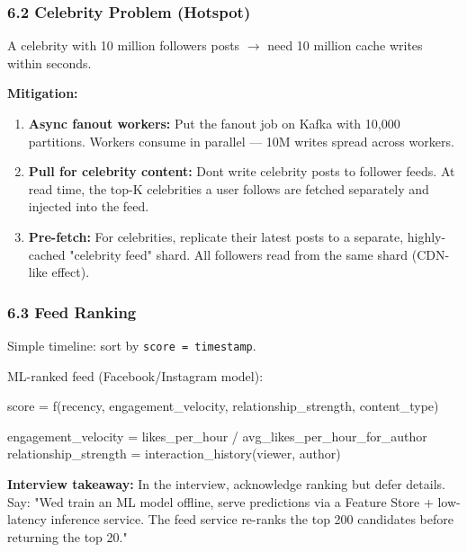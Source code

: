 \documentclass[11pt]{article}
\providecommand{\tightlist}{\setlength{\itemsep}{1pt}\setlength{\parskip}{0pt}}
\newenvironment{Shaded}{\begin{snugshade}}{\end{snugshade}}
\newcommand{\NormalTok}[1]{\textcolor[rgb]{0.81,0.81,0.76}{#1}}
\newcommand{\OperatorTok}[1]{\textcolor[rgb]{0.81,0.81,0.76}{#1}}
\begin{document}
\subsubsection{6.2 Celebrity Problem (Hotspot)}\label{62-celebrity-problem-hotspot}

A celebrity with 10 million followers posts \(\rightarrow\) need 10 million cache writes within seconds.

\textbf{Mitigation:}

\begin{enumerate}
\def\labelenumi{\arabic{enumi}.}
\tightlist
\item
  \textbf{Async fanout workers:} Put the fanout job on Kafka with 10,000 partitions. Workers consume in parallel --- 10M writes spread across workers.
\item
  \textbf{Pull for celebrity content:} Don\textquotesingle t write celebrity posts to follower feeds. At read time, the top-K celebrities a user follows are fetched separately and injected into the feed.
\item
  \textbf{Pre-fetch:} For celebrities, replicate their latest posts to a separate, highly-cached "celebrity feed" shard. All followers read from the same shard (CDN-like effect).
\end{enumerate}

\subsubsection{6.3 Feed Ranking}\label{63-feed-ranking}

Simple timeline: sort by \texttt{score\ =\ timestamp}.

ML-ranked feed (Facebook/Instagram model):


\begin{Shaded}
\begin{Highlighting}[]
\NormalTok{score }\OperatorTok{=}\NormalTok{ f(recency, engagement\_velocity, relationship\_strength, content\_type)}

\NormalTok{engagement\_velocity }\OperatorTok{=}\NormalTok{ likes\_per\_hour }\OperatorTok{/}\NormalTok{ avg\_likes\_per\_hour\_for\_author}
\NormalTok{relationship\_strength }\OperatorTok{=}\NormalTok{ interaction\_history(viewer, author)}
\end{Highlighting}
\end{Shaded}

\textbf{Interview takeaway:} In the interview, acknowledge ranking but defer details. Say: "We\textquotesingle d train an ML model offline, serve predictions via a Feature Store + low-latency inference service. The feed service re-ranks the top 200 candidates before returning the top 20."
\end{document}
